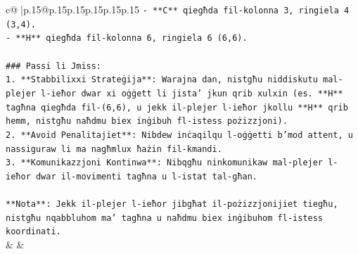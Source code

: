 \documentclass{article}
\begin{document}
{\begin{supertabular}{c@{$\;$}|p{.15\linewidth}@{}p{.15\linewidth}p{.15\linewidth}p{.15\linewidth}p{.15\linewidth}p{.15\linewidth}}
{{{\texttt{{-} **C** qiegħda fil{-}kolonna 3, ringiela 4 (3,4).} \\
\texttt{{-} **H** qiegħda fil{-}kolonna 6, ringiela 6 (6,6).} \\
\\ 
\texttt{\#\#\# Passi li Jmiss:} \\
\texttt{1. **Stabbilixxi Strateġija**: Warajna dan, nistgħu niddiskutu mal{-}plejer l{-}ieħor dwar xi oġġett li jista' jkun qrib xulxin (es. **H** tagħna qiegħda fil{-}(6,6), u jekk il{-}plejer l{-}ieħor jkollu **H** qrib hemm, nistgħu naħdmu biex inġibuh fl{-}istess pożizzjoni).} \\
\texttt{2. **Avoid Penalitajiet**: Nibdew inċaqilqu l{-}oġġetti b'mod attent, u nassiguraw li ma nagħmlux ħażin fil{-}kmandi.} \\
\texttt{3. **Komunikazzjoni Kontinwa**: Nibqgħu ninkomunikaw mal{-}plejer l{-}ieħor dwar il{-}movimenti tagħna u l{-}istat tal{-}għan.} \\
\\ 
\texttt{**Nota**: Jekk il{-}plejer l{-}ieħor jibgħat il{-}pożizzjonijiet tiegħu, nistgħu nqabbluhom ma' tagħna u naħdmu biex inġibuhom fl{-}istess koordinati.} \\
            }
        }
    }
    & & \\ \\


\end{supertabular}}
\end{document}
